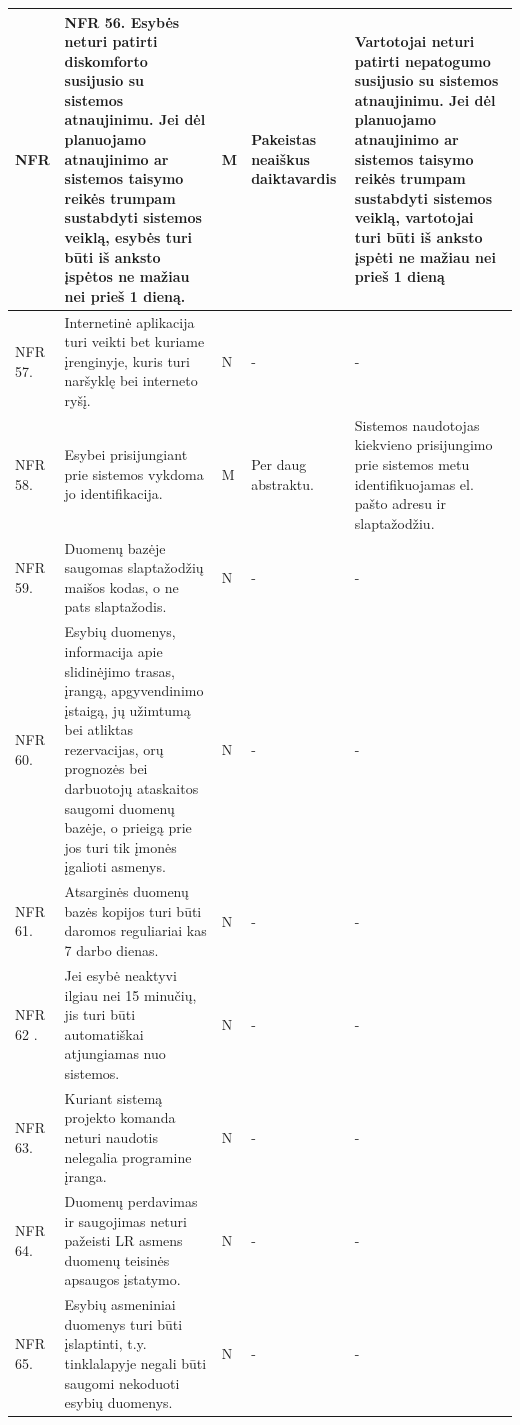 \documentclass[oneside]{VUMIFPSkursinis}
\begin{document}
\begin{longtable}{ | p{}|p{}|p{}|p{}|p{}| }
	NFR & 
NFR 56. Esybės neturi patirti diskomforto susijusio su sistemos atnaujinimu. Jei dėl planuojamo atnaujinimo ar sistemos taisymo reikės trumpam sustabdyti sistemos veiklą, esybės turi būti iš anksto įspėtos ne mažiau nei prieš 1 dieną. & M & Pakeistas neaiškus daiktavardis & Vartotojai neturi patirti nepatogumo susijusio su sistemos atnaujinimu. Jei dėl planuojamo atnaujinimo ar sistemos taisymo reikės trumpam sustabdyti sistemos veiklą, vartotojai turi būti iš anksto įspėti ne mažiau nei prieš 1 dieną\\ \hline
NFR 57.&  Internetinė aplikacija turi veikti bet kuriame įrenginyje, kuris turi naršyklę bei interneto ryšį. & N & - & - \\ \hline
NFR 58.&  Esybei prisijungiant prie sistemos vykdoma jo identifikacija. & M & Per daug abstraktu. & Sistemos naudotojas kiekvieno prisijungimo prie sistemos metu identifikuojamas el. pašto adresu ir slaptažodžiu.\\ \hline
NFR 59. & Duomenų bazėje saugomas slaptažodžių maišos kodas, o ne pats slaptažodis. & N & - & - \\ \hline
NFR 60.& Esybių duomenys, informacija apie slidinėjimo trasas, įrangą, apgyvendinimo įstaigą, jų užimtumą bei atliktas rezervacijas, orų prognozės bei darbuotojų ataskaitos saugomi duomenų bazėje, o prieigą prie jos turi tik įmonės įgalioti asmenys. & N & - &  -  \\ \hline
NFR 61. & Atsarginės duomenų bazės kopijos turi būti daromos reguliariai kas 7 darbo dienas. & N & - & -  \\ \hline
NFR 62 .&  Jei esybė neaktyvi ilgiau nei 15 minučių, jis turi būti automatiškai atjungiamas nuo sistemos. & N & - & - \\ \hline
NFR 63. & Kuriant sistemą projekto komanda neturi naudotis nelegalia programine įranga.& N & - & - \\ \hline
NFR 64. & Duomenų perdavimas ir saugojimas neturi pažeisti LR asmens duomenų teisinės apsaugos įstatymo. & N & - & -  \\ \hline
NFR 65. & Esybių asmeniniai duomenys turi būti įslaptinti, t.y. tinklalapyje negali būti saugomi nekoduoti esybių duomenys. & N & - & - \\ \hline





 



\end{longtable}
	
\end{document}
